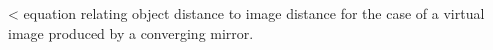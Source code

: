 <%
equation relating object distance to image distance for the
case of a virtual image produced by a converging mirror.
